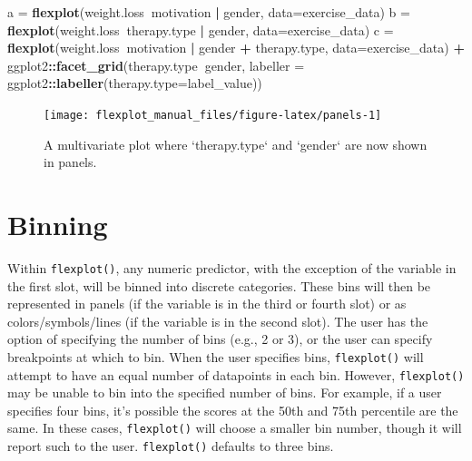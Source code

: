 \documentclass[,]{book}
\newenvironment{Shaded}{\begin{snugshade}}{\end{snugshade}}
\newcommand{\KeywordTok}[1]{\textcolor[rgb]{0.13,0.29,0.53}{\textbf{#1}}}
\newcommand{\DataTypeTok}[1]{\textcolor[rgb]{0.13,0.29,0.53}{#1}}
\newcommand{\StringTok}[1]{\textcolor[rgb]{0.31,0.60,0.02}{#1}}
\newcommand{\OperatorTok}[1]{\textcolor[rgb]{0.81,0.36,0.00}{\textbf{#1}}}
\newcommand{\NormalTok}[1]{#1}
\begin{document}
\begin{Shaded}
\begin{Highlighting}[]
\NormalTok{a =}\StringTok{ }\KeywordTok{flexplot}\NormalTok{(weight.loss}\OperatorTok{~}\NormalTok{motivation }\OperatorTok{|}\StringTok{ }\NormalTok{gender, }
             \DataTypeTok{data=}\NormalTok{exercise_data)}
\NormalTok{b =}\StringTok{ }\KeywordTok{flexplot}\NormalTok{(weight.loss}\OperatorTok{~}\NormalTok{therapy.type }\OperatorTok{|}\StringTok{ }\NormalTok{gender, }
             \DataTypeTok{data=}\NormalTok{exercise_data)}
\NormalTok{c =}\StringTok{ }\KeywordTok{flexplot}\NormalTok{(weight.loss}\OperatorTok{~}\NormalTok{motivation }\OperatorTok{|}\StringTok{  }\NormalTok{gender }\OperatorTok{+}\StringTok{ }\NormalTok{therapy.type, }
             \DataTypeTok{data=}\NormalTok{exercise_data) }\OperatorTok{+}
\StringTok{      }\NormalTok{ggplot2}\OperatorTok{::}\KeywordTok{facet_grid}\NormalTok{(therapy.type}\OperatorTok{~}\NormalTok{gender, }
                          \DataTypeTok{labeller =}\NormalTok{ ggplot2}\OperatorTok{::}\KeywordTok{labeller}\NormalTok{(}\DataTypeTok{therapy.type=}\NormalTok{label_value))}
\end{Highlighting}
\end{Shaded}

\begin{figure}

{\centering \texttt{[image: flexplot\_manual\_files/figure-latex/panels-1]} 

}

\caption{A multivariate plot where `therapy.type` and `gender` are now shown in panels.}\label{fig:panels}
\end{figure}

\section*{Binning}\label{binning}

Within \texttt{flexplot()}, any numeric predictor, with the exception of
the variable in the first slot, will be binned into discrete categories.
These bins will then be represented in panels (if the variable is in the
third or fourth slot) or as colors/symbols/lines (if the variable is in
the second slot). The user has the option of specifying the number of
bins (e.g., 2 or 3), or the user can specify breakpoints at which to
bin. When the user specifies bins, \texttt{flexplot()} will attempt to
have an equal number of datapoints in each bin. However,
\texttt{flexplot()} may be unable to bin into the specified number of
bins. For example, if a user specifies four bins, it's possible the
scores at the 50th and 75th percentile are the same. In these cases,
\texttt{flexplot()} will choose a smaller bin number, though it will
report such to the user. \texttt{flexplot()} defaults to three bins.
\end{document}
